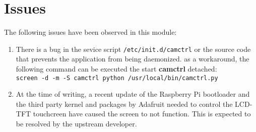 \section{Issues}
The following issues have been observed in this module:
   \begin{enumerate}
      \item There is a bug in the sevice script \texttt{/etc/init.d/camctrl} or
         the source code that prevents the application from being daemonized. as
         a workaround, the following command can be executed the start
         \textbf{camctrl} detached:\\
         \texttt{screen -d -m -S camctrl python /usr/local/bin/camctrl.py}
      \item At the time of writing, a recent update of the Raspberry Pi
         bootloader and the third party kernel and packages by Adafruit needed
         to control the LCD-TFT touchcreen have caused the screen to not
         function. This is expected to be resolved by the upstream developer.
   \end{enumerate}

